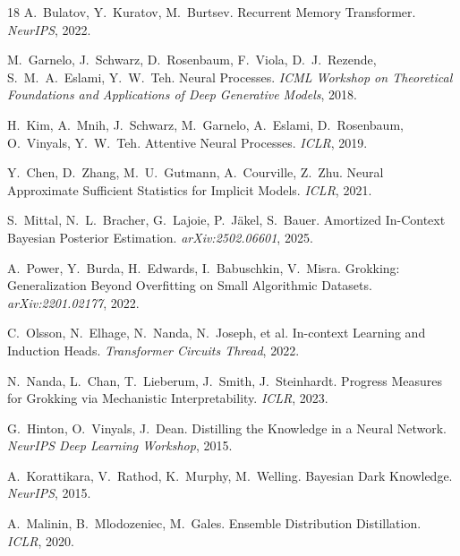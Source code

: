 \documentclass[11pt]{article}
\begin{document}
\begin{thebibliography}{18}
A.~Bulatov, Y.~Kuratov, M.~Burtsev.
\newblock Recurrent Memory Transformer.
\newblock \emph{NeurIPS}, 2022.

M.~Garnelo, J.~Schwarz, D.~Rosenbaum, F.~Viola, D.~J.~Rezende,
S.~M.~A.~Eslami, Y.~W.~Teh.
\newblock Neural Processes.
\newblock \emph{ICML Workshop on Theoretical Foundations and Applications
of Deep Generative Models}, 2018.

H.~Kim, A.~Mnih, J.~Schwarz, M.~Garnelo, A.~Eslami, D.~Rosenbaum,
O.~Vinyals, Y.~W.~Teh.
\newblock Attentive Neural Processes.
\newblock \emph{ICLR}, 2019.

Y.~Chen, D.~Zhang, M.~U.~Gutmann, A.~Courville, Z.~Zhu.
\newblock Neural Approximate Sufficient Statistics for Implicit Models.
\newblock \emph{ICLR}, 2021.

S.~Mittal, N.~L.~Bracher, G.~Lajoie, P.~J\"akel, S.~Bauer.
\newblock Amortized In-Context Bayesian Posterior Estimation.
\newblock \emph{arXiv:2502.06601}, 2025.

A.~Power, Y.~Burda, H.~Edwards, I.~Babuschkin, V.~Misra.
\newblock Grokking: Generalization Beyond Overfitting on Small Algorithmic
Datasets.
\newblock \emph{arXiv:2201.02177}, 2022.

C.~Olsson, N.~Elhage, N.~Nanda, N.~Joseph, et al.
\newblock In-context Learning and Induction Heads.
\newblock \emph{Transformer Circuits Thread}, 2022.

N.~Nanda, L.~Chan, T.~Lieberum, J.~Smith, J.~Steinhardt.
\newblock Progress Measures for Grokking via Mechanistic Interpretability.
\newblock \emph{ICLR}, 2023.

G.~Hinton, O.~Vinyals, J.~Dean.
\newblock Distilling the Knowledge in a Neural Network.
\newblock \emph{NeurIPS Deep Learning Workshop}, 2015.

A.~Korattikara, V.~Rathod, K.~Murphy, M.~Welling.
\newblock Bayesian Dark Knowledge.
\newblock \emph{NeurIPS}, 2015.

A.~Malinin, B.~Mlodozeniec, M.~Gales.
\newblock Ensemble Distribution Distillation.
\newblock \emph{ICLR}, 2020.


\end{thebibliography}
\end{document}
